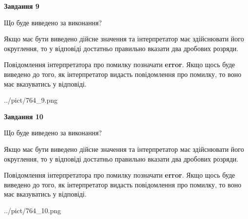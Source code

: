 \documentclass[12pt, ukrainian]{article}
\begin{document}
{\begin {Large}
{\begin {center}\textbf{Завдання 9}\end {center}}\par
Що буде виведено за виконання? \par

Якщо має бути виведено дійсне значення та інтерпретатор має здійснювати його округлення, 
то у відповіді достатньо правильно вказати два дробових розряди.

Повідомлення інтерпретатора про помилку позначати \textbf{error}.
Якщо щось буде виведено до того, як інтерпретатор видасть повідомлення про помилку, 
то воно має вказуватись у відповіді. \par

\begin{center}
	{../pict/764_9.png}
\end{center}
\newpage

{\begin {center}\textbf{Завдання 10}\end {center}}\par
Що буде виведено за виконання? \par

Якщо має бути виведено дійсне значення та інтерпретатор має здійснювати його округлення, 
то у відповіді достатньо правильно вказати два дробових розряди.

Повідомлення інтерпретатора про помилку позначати \textbf{error}.
Якщо щось буде виведено до того, як інтерпретатор видасть повідомлення про помилку, 
то воно має вказуватись у відповіді. \par

\begin{center}
	{../pict/764_10.png}
\end{center}
\newpage

\end {Large}}
\end{document}
